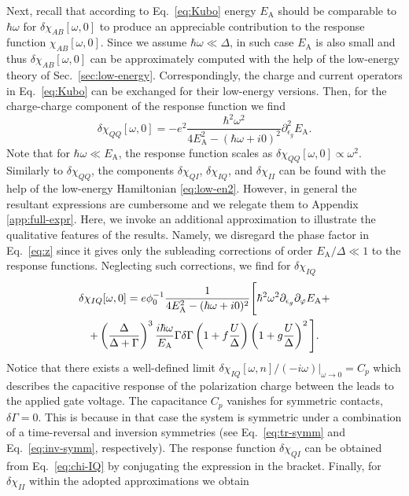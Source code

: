\documentclass[aps,reprint,longbibliography, prb]{revtex4-2}
\begin{document}
Next, recall that according to Eq.~\eqref{eq:Kubo} energy $E_\mathrm{A}$ should be comparable to $\hbar\omega$ for $\delta\chi_{AB}[\omega, 0]$ to produce an appreciable contribution to the response function $\chi_{AB}[\omega, 0]$. Since we assume $\hbar\omega \ll \Delta$, in such case $E_\mathrm{A}$ is also small and thus $\delta\chi_{AB}[\omega, 0]$ can be approximately computed with the help of the low-energy theory of Sec.~\ref{sec:low-energy}. Correspondingly, the charge and current operators in Eq.~\eqref{eq:Kubo} can be exchanged for their low-energy versions. Then, for the charge-charge component of the response function we find
\begin{equation}
    \delta\chi_{QQ}[\omega,0] = - e^2 \frac{\hbar^2\omega^2}{4E_\mathrm{A}^2-(\hbar\omega+i0)^2} \partial_{\epsilon_g}^2 E_{\mathrm{A}}.
    \label{eq:chi-QQ}
\end{equation}
Note that for $\hbar\omega \ll E_\mathrm{A}$, the response function scales as $\delta\chi_{QQ}[\omega,0] \propto \omega^2$. Similarly to $\delta\chi_{QQ}$, the components $\delta\chi_{QI}$, $\delta\chi_{IQ}$, and $\delta\chi_{II}$ can be found with the help of the low-energy Hamiltonian \eqref{eq:low-en2}. However, in general the resultant expressions are cumbersome and we relegate them to Appendix \ref{app:full-expr}. Here, we invoke an additional approximation to illustrate the qualitative features of the results. Namely, we disregard the phase factor in Eq.~\eqref{eq:z} since it gives only the subleading corrections of order $E_\mathrm{A}/\Delta \ll 1$ to the response functions. Neglecting such corrections, we find for $\delta\chi_{IQ}$
\begin{gather}
    \delta\chi_{IQ}[\omega, 0] = e\phi_0^{-1}\frac{1}{4 E_\mathrm{A}^2 - (\hbar\omega + i0)^2}\Bigg[\hbar^2\omega^2 \partial_{\epsilon_g}\partial_{\varphi} E_{\mathrm{A}}+\notag\\ + \left(\frac{\Delta}{\Delta + \Gamma}\right)^3\frac{i\hbar\omega}{E_{\mathrm{A}}}\Gamma\delta\Gamma\left(1+f \frac{U}{\Delta}\right)\left(1+g \frac{U}{\Delta}\right)^2\Bigg].
\label{eq:chi-IQ}
\end{gather}
Notice that there exists a well-defined limit $\delta\chi_{IQ}[\omega,n]/(-i\omega)|_{\omega \rightarrow 0} = C_p$ which describes the capacitive response of the polarization charge between the leads to the applied gate voltage. The capacitance $C_p$ vanishes for symmetric contacts, $\delta\Gamma = 0$. This is because in that case the system is symmetric under a combination of a time-reversal and inversion symmetries (see Eq.~\eqref{eq:tr-symm} and Eq.~\eqref{eq:inv-symm}, respectively). The response function $\delta \chi_{QI}$ can be obtained from Eq.~\eqref{eq:chi-IQ} by conjugating the expression in the bracket. Finally, for $\delta \chi_{II}$ within the adopted approximations we obtain
\end{document}
